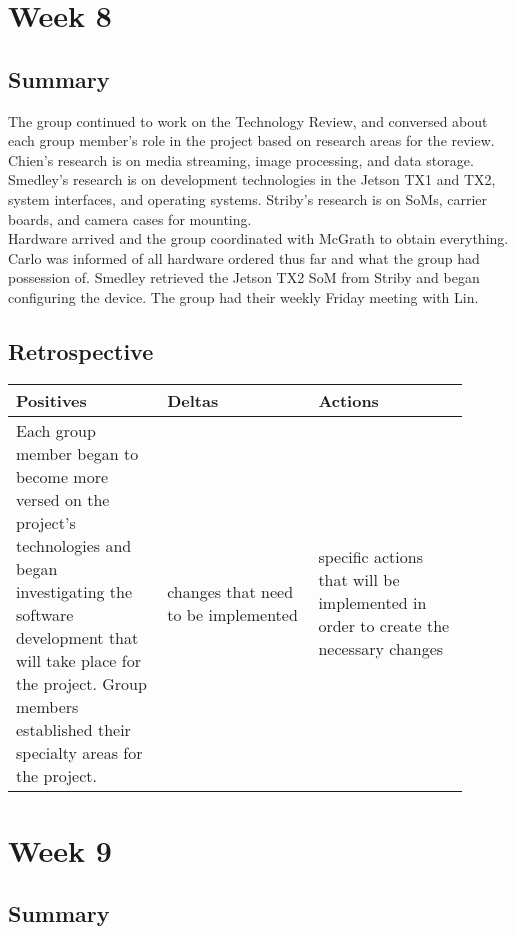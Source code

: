 \documentclass[letterpaper,10pt,serif,draftclsnofoot,onecolumn,compsoc,titlepage]{IEEEtran}
\begin{document}
\section{Week 8}

\subsection{Summary}

The group continued to work on the Technology Review, and conversed about each group 
member's role in the project based on research areas for the review. Chien's research 
is on media streaming, image processing, and data storage. Smedley's research is on 
development technologies in the Jetson TX1 and TX2, system interfaces, and operating 
systems. Striby's research is on SoMs, carrier boards, and camera cases for mounting. \\

Hardware arrived and the group coordinated with McGrath to obtain everything. Carlo was 
informed of all hardware ordered thus far and what the group had possession of. Smedley 
retrieved the Jetson TX2 SoM from Striby and began configuring the device. The group 
had their weekly Friday meeting with Lin.\\

\subsection{Retrospective}

\begin{tabular}{|p{0.3\linewidth}|p{0.3\linewidth}|p{0.3\linewidth}|}
   \hline
   \textbf{Positives} & \textbf{Deltas} & \textbf{Actions}\\ 
   \hline
   Each group member began to become more versed on the project's technologies and 
   began investigating the software development that will take place for the project. 
   Group members established their specialty areas for the project.  
   & 
   changes that need to be implemented 
   & 
   specific actions that will be implemented in order to create the necessary 
   changes \\
   \hline
\end{tabular}

\section{Week 9}

\subsection{Summary}
\end{document}
